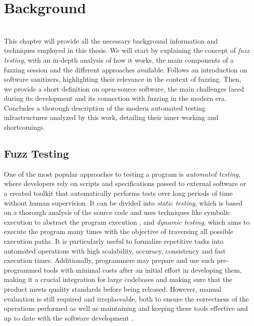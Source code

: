 \chapter{Background} \label{chap_2}
\ \\
This chapter will provide all the necessary background information and techniques employed in this thesis.
We will start by explaining the concept of \textit{fuzz testing}, with an in-depth analysis of how it works, the main components of a fuzzing session and the different approaches available.
Follows an introduction on software sanitizers, highlighting their relevance in the context of fuzzing.
Then, we provide a short definition on open-source software, the main challenges faced during its development and its connection with fuzzing in the modern era.
Concludes a thorough description of the modern automated testing infrastructures analyzed by this work, detailing their inner working and shortcomings.





\section{Fuzz Testing}

One of the most popular approaches to testing a program is \textit{automated testing}, where developers rely on scripts and specifications passed to external software or a created toolkit that automatically performs tests over long periods of time without human supervision. It can be divided into \textit{static testing}, which is based on a thorough analysis of the source code and uses techniques like symbolic execution to abstract the program execution , and \textit{dynamic testing}, which aims to execute the program many times with the objective of traversing all possible execution paths. It is particularly useful to formalize repetitive tasks into automated operations with high scalability, accuracy, consistency and fast execution times. Additionally, programmers may prepare and use such pre-programmed tools with minimal costs after an initial effort in developing them, making it a crucial integration for large codebases and making sure that the product meets quality standards before being released. However, manual evaluation is still required and irreplaceable, both to ensure the correctness of the operations performed as well as maintaining and keeping these tools effective and up to date with the software development \cite{automated_testing}. 


